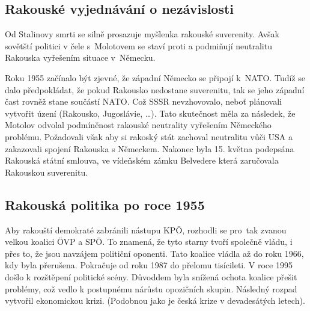 \documentclass[a2 paper]{article}
\begin{document}
\begin{landscape}
\begin{minipage}[c]{\linewidth}
\begin{minipage}[t]{0.5\linewidth}
	\subsection*{Rakouské vyjednávání o nezávislosti}
	Od Stalinovy smrti se silně prosazuje myšlenka rakouské suverenity. Avšak sovětští politici v čele s~Molotovem se staví proti a podmiňují neutralitu Rakouska vyřešením situace v~Německu. \par
	Roku 1955 začínalo být zjevné, že západní Německo se připojí k~NATO. Tudíž se dalo předpokládat, že pokud Rakousko nedostane suverenitu, tak se jeho západní čast rovněž stane součástí NATO. Což SSSR nevzhovovalo, neboť plánovali vytvořit  úzení (Rakousko, Jugoslávie, \dots). Tato skutečnost měla za následek, že Motolov odvolal  podmíněnost rakouské neutrality vyřešením Německého problému. Požadovali však aby si rakoský stát zachoval neutralitu vůči USA a zakazovali spojení Rakouska s Německem. Nakonec byla 15. května podepsána Rakouská státní smlouva, ve vídeňském zámku Belvedere která zaručovala Rakouskou suverenitu.
	\subsection*{Rakouská politika po roce 1955}
	Aby rakouští demokraté zabránili nástupu KPÖ, rozhodli se pro~tak zvanou velkou koalici ÖVP a SPÖ. To znamená, že tyto starny tvoří společně vládu, i přes to, že jsou navzájem političní oponenti. Tato koalice vládla až do roku 1966, kdy byla přerušena. Pokračuje od roku 1987 do přelomu tisícileti. V roce 1995 došlo k rozštěpení politické scény. Důvoddem byla snížená ochota koalice přešit problémy, což vedlo k postupnému nárůstu opozičních skupin. Následný rozpad vytvořil ekonomickou krizi. (Podobnou jako je česká krize v devadesátých letech).

\end{minipage}
\end{minipage}
\end{landscape}
\end{document}
